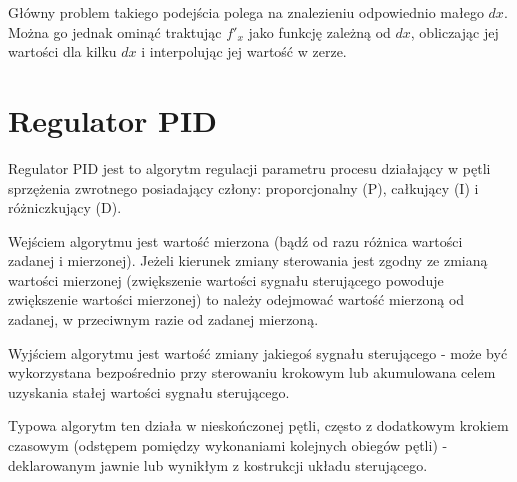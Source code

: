 \documentclass{pdfBooklets}
\begin{document}
Główny problem takiego podejścia polega na znalezieniu odpowiednio małego $dx$. Można go jednak ominąć traktując $f'_x$ jako funkcję zależną od $dx$, obliczając jej wartości dla kilku $dx$ i interpolując jej wartość w zerze.


\section{Regulator PID {\Symbola 🤔}}

Regulator PID jest to algorytm regulacji parametru procesu działający w pętli sprzężenia zwrotnego posiadający człony: proporcjonalny (P), całkujący (I) i różniczkujący (D).

Wejściem algorytmu jest wartość mierzona (bądź od razu różnica wartości zadanej i mierzonej). Jeżeli kierunek zmiany sterowania jest zgodny ze zmianą wartości mierzonej (zwiększenie wartości sygnału sterującego powoduje zwiększenie wartości mierzonej) to należy odejmować wartość mierzoną od zadanej, w przeciwnym razie od zadanej mierzoną.

Wyjściem algorytmu jest wartość zmiany jakiegoś sygnału sterującego - może być wykorzystana bezpośrednio przy sterowaniu krokowym lub akumulowana celem uzyskania stałej wartości sygnału sterującego.

Typowa algorytm ten działa w nieskończonej pętli, często z dodatkowym krokiem czasowym (odstępem pomiędzy wykonaniami kolejnych obiegów pętli) - deklarowanym jawnie lub wynikłym z kostrukcji układu sterującego.
\end{document}
